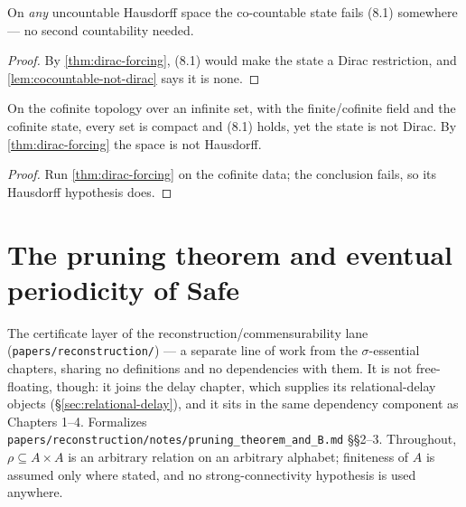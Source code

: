 \begin{corollary}
  \label{cor:cocountable-fails-hausdorff}
  \leanok
  On \emph{any} uncountable Hausdorff space the co-countable state fails (8.1)
  somewhere --- no second countability needed.
\end{corollary}

\begin{proof}
  \leanok
  By \ref{thm:dirac-forcing}, (8.1) would make the state a Dirac restriction,
  and \ref{lem:cocountable-not-dirac} says it is none.
\end{proof}

\begin{proposition}
  \label{prop:cofinite-red-flag}
  \leanok
  On the cofinite topology over an infinite set, with the finite/cofinite field
  and the cofinite state, every set is compact and (8.1) holds, yet the state is
  not Dirac. By \ref{thm:dirac-forcing} the space is not Hausdorff.
\end{proposition}

\begin{proof}
  \leanok
  Run \ref{thm:dirac-forcing} on the cofinite data; the conclusion fails, so its
  Hausdorff hypothesis does.
\end{proof}
\chapter{The pruning theorem and eventual periodicity of Safe}

The certificate layer of the reconstruction/commensurability lane
(\texttt{papers/reconstruction/}) --- a separate line of work from the
$\sigma$-essential chapters, sharing no definitions and no dependencies with
them. It is not free-floating, though: it joins the delay chapter, which
supplies its relational-delay objects (\S\ref{sec:relational-delay}), and it
sits in the same dependency component as Chapters 1--4. Formalizes \texttt{papers/reconstruction/notes/pruning\_theorem\_and\_B.md}
\S\S2--3. Throughout, $\rho \subseteq A \times A$ is an arbitrary relation on an
arbitrary alphabet; finiteness of $A$ is assumed only where stated, and no
strong-connectivity hypothesis is used anywhere.

